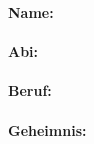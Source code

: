 \ifodd\stdnum
	\def\tablex{0.5\linewidth}
	\def\tablewidth{0.55\linewidth} %
\else
	\def\tablex{-0cm}
	\def\tablewidth{0.55\linewidth} %
\fi

\hspace*{\tablex}\vspace*{1.4cm}\begin{minipage}{\tablewidth}
	\vspace*{.5cm}
	\begin{normalsize}
		\textbf{Name:}\\ \stdname\\
		\textbf{Abi:}\\ \stdabi\\
		\textbf{Beruf:}\\ \stdprof\\
		\textbf{Geheimnis:}\\ \stdsecret\\
	 \end{normalsize}
\end{minipage}
